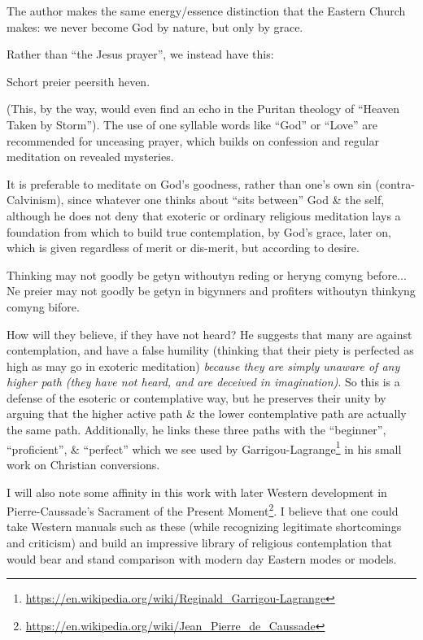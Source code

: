 The author makes the same energy/essence distinction that the Eastern Church makes: we never become God by nature, but only by grace.

Rather than ``the Jesus prayer'', we instead have this:

\begin{quotex}
Schort preier peersith heven.
\end{quotex}


(This, by the way, would even find an echo in the Puritan theology of ``Heaven Taken by Storm''). The use of one syllable words like ``God'' or ``Love'' are recommended for unceasing prayer, which builds on confession and regular meditation on revealed mysteries.

It is preferable to meditate on God's goodness, rather than one's own sin (contra-Calvinism), since whatever one thinks about ``sits between'' God \& the self, although he does not deny that exoteric or ordinary religious meditation lays a foundation from which to build true contemplation, by God's grace, later on, which is given regardless of merit or dis-merit, but according to desire.

\begin{quotex}
Thinking may not goodly be getyn withoutyn reding or heryng comyng before... Ne preier may not goodly be getyn in bigynners and profiters withoutyn thinkyng comyng bifore.
\end{quotex}


How will they believe, if they have not heard? He suggests that many are against contemplation, and have a false humility (thinking that their piety is perfected as high as may go in exoteric meditation) \emph{because they are simply unaware of any higher path (they have not heard, and are deceived in imagination)}. So this is a defense of the esoteric or contemplative way, but he preserves their unity by arguing that the higher active path \& the lower contemplative path are actually the same path. Additionally, he links these three paths with the ``beginner'', ``proficient'', \& ``perfect'' which we see used by Garrigou-Lagrange\footnote{\url{https://en.wikipedia.org/wiki/Reginald\_Garrigou-Lagrange}} in his small work on Christian conversions.

I will also note some affinity in this work with later Western development in Pierre-Caussade's Sacrament of the Present Moment\footnote{\url{https://en.wikipedia.org/wiki/Jean\_Pierre\_de\_Caussade}}. I believe that one could take Western manuals such as these (while recognizing legitimate shortcomings and criticism) and build an impressive library of religious contemplation that would bear and stand comparison with modern day Eastern modes or models.

